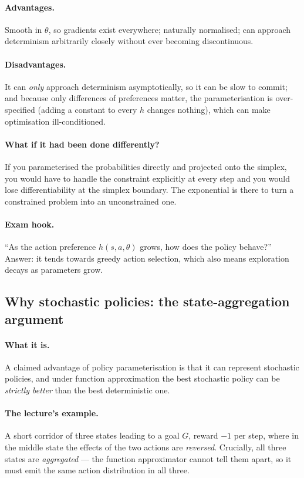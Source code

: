 \documentclass[11pt,a4paper]{article}
\begin{document}
\paragraph{Advantages.} Smooth in $\theta$, so gradients exist everywhere;
naturally normalised; can approach determinism arbitrarily closely without
ever becoming discontinuous.

\paragraph{Disadvantages.} It can \emph{only} approach determinism
asymptotically, so it can be slow to commit; and because only differences of
preferences matter, the parameterisation is over-specified (adding a constant
to every $h$ changes nothing), which can make optimisation ill-conditioned.

\paragraph{What if it had been done differently?} If you parameterised the
probabilities directly and projected onto the simplex, you would have to
handle the constraint explicitly at every step and you would lose
differentiability at the simplex boundary. The exponential is there to turn a
constrained problem into an unconstrained one.

\paragraph{Exam hook.} ``As the action preference $h(s,a,\theta)$ grows, how
does the policy behave?'' Answer: it tends towards greedy action selection,
which also means exploration decays as parameters grow.

\subsection{Why stochastic policies: the state-aggregation argument}

\paragraph{What it is.} A claimed advantage of policy parameterisation is that
it can represent stochastic policies, and under function approximation the
best stochastic policy can be \emph{strictly better} than the best
deterministic one.

\paragraph{The lecture's example.} A short corridor of three states leading to
a goal $G$, reward $-1$ per step, where in the middle state the effects of the
two actions are \emph{reversed}. Crucially, all three states are
\emph{aggregated} --- the function approximator cannot tell them apart, so it
must emit the same action distribution in all three.
\end{document}
